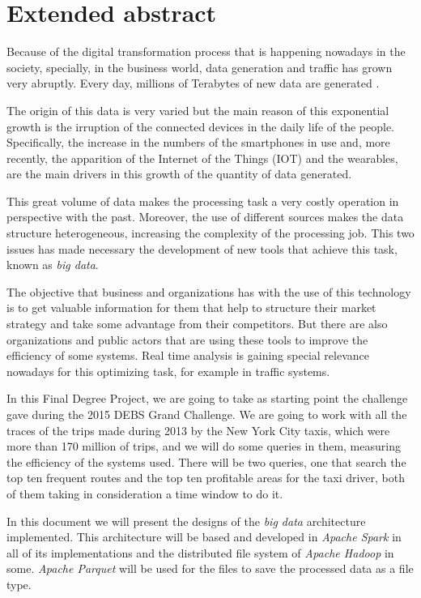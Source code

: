 \chapter{Extended abstract \label{sec:resumenIngles}}

Because of the digital transformation process that is happening nowadays in the society, specially, in the business world, data generation and traffic has grown very abruptly. Every day, millions of Terabytes of new data are generated \cite{BDStats}.

The origin of this data is very varied but the main reason of this exponential growth is the irruption of the connected devices in the daily life of the people. Specifically, the increase in the numbers of the smartphones in use \cite{phoneGrowth} and, more recently, the apparition of the Internet of the Things (IOT) and the wearables, are the main drivers in this growth of the quantity of data generated.

This great volume of data makes the processing task a very costly operation in perspective with the past. Moreover, the use of different sources makes the data structure heterogeneous, increasing the complexity of the processing job. This two issues has made necessary the development of new tools that achieve this task, known as \textit{big data}.

The objective that business and organizations has with the use of this technology is to get valuable information for them that help to structure their market strategy and take some advantage from their competitors. But there are also organizations and public actors that are using these tools to improve the efficiency of some systems. Real time analysis is gaining special relevance nowadays for this optimizing task, for example in traffic systems.

In this Final Degree Project, we are going to take as starting point the challenge gave during the 2015 \gls{DEBS} Grand Challenge. We are going to work with all the traces of the trips made during 2013 by the New York City taxis, which were more than 170 million of trips, and we will do some queries in them, measuring the efficiency of the systems used. There will be two queries, one that search the top ten frequent routes and the top ten profitable areas for the taxi driver, both of them taking in consideration a time window to do it.

In this document we will present the designs of the \textit{big data} architecture implemented. This architecture will be based and developed in \textit{Apache Spark} \cite{spark} in all of its implementations and the distributed file system of \textit{Apache Hadoop} \cite{hadoop} in some. \textit{Apache Parquet} \cite{parquet} will be used for the files to save the processed data as a file type.

